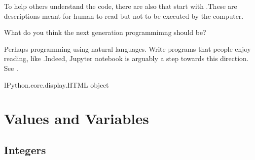 \documentclass[letterpaper,10pt,english]{sphinxmanual}
\begin{document}
To help others understand the code, there are also  that start with \sphinxcode{\sphinxupquote{\#}}.These are descriptions meant for human to read but not to be executed by the computer.

 What do you think the next generation programmimng should be?

Perhaps programming using natural languages. Write programs that people enjoy reading, like .Indeed, Jupyter notebook is arguably a step towards this direction. See .

\begin{sphinxVerbatim}[commandchars=\\\{\}]
    
\end{sphinxVerbatim}

\begin{sphinxVerbatim}[commandchars=\\\{\}]
\PYGZlt{}IPython.core.display.HTML object\PYGZgt{}
\end{sphinxVerbatim}


\chapter{Values and Variables}
\label{\detokenize{Lecture2/Values and Variables:values-and-variables}}\label{\detokenize{Lecture2/Values and Variables::doc}}

\section{Integers}
\label{\detokenize{Lecture2/Values and Variables:integers}}

\begin{sphinxVerbatim}[commandchars=\\\{\}]
  
\end{sphinxVerbatim}
\end{document}
